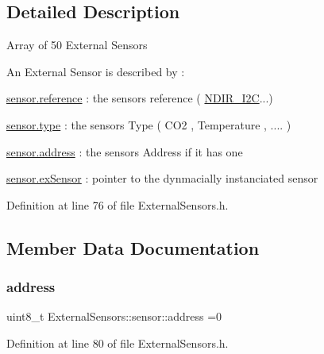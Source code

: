 \subsection{Detailed Description}
Array of 50 External Sensors

An External Sensor is described by \+:

\hyperlink{struct_external_sensors_1_1sensor_afed5bdfd49732202a368b600cb8396fe}{sensor.\+reference} \+: the sensor\textquotesingle{}s reference ( \hyperlink{class_n_d_i_r___i2_c}{N\+D\+I\+R\+\_\+\+I2C}...)

\hyperlink{struct_external_sensors_1_1sensor_a6acfdb02c742c2110d7bd2b5d9fce9e7}{sensor.\+type} \+: the sensor\textquotesingle{}s Type ( C\+O2 , Temperature , .... )

\hyperlink{struct_external_sensors_1_1sensor_a8d70ca58524521ed054fc6b81eb58d34}{sensor.\+address} \+: the sensor\textquotesingle{}s Address if it has one

\hyperlink{struct_external_sensors_1_1sensor_a9bca150fd468b8d0e090e6d72c5c2b48}{sensor.\+ex\+Sensor} \+: pointer to the dynmacially instanciated sensor 

Definition at line 76 of file External\+Sensors.\+h.



\subsection{Member Data Documentation}
\mbox{\label{struct_external_sensors_1_1sensor_a8d70ca58524521ed054fc6b81eb58d34}} 
\subsubsection{\texorpdfstring{address}{address}}
{\footnotesize\ttfamily uint8\+\_\+t External\+Sensors\+::sensor\+::address =0}



Definition at line 80 of file External\+Sensors.\+h.

\mbox{\label{struct_external_sensors_1_1sensor_a9bca150fd468b8d0e090e6d72c5c2b48}} 
